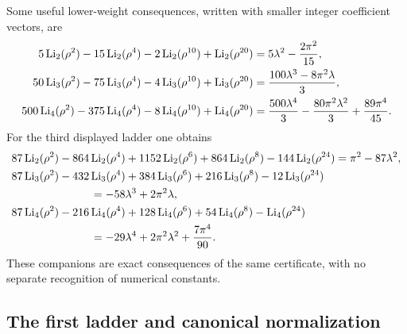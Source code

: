Some useful lower-weight consequences, written with smaller integer
coefficient vectors, are
\begin{align}
 5\operatorname{Li}_2(\rho^2)-15\operatorname{Li}_2(\rho^4)-2\operatorname{Li}_2(\rho^{10})
    +\operatorname{Li}_2(\rho^{20})
 &=5\lambda^2-\frac{2\pi^2}{15},
 \label{gold:eq:II-two}\\
 50\operatorname{Li}_3(\rho^2)-75\operatorname{Li}_3(\rho^4)-4\operatorname{Li}_3(\rho^{10})
    +\operatorname{Li}_3(\rho^{20})
 &=\frac{100\lambda^3-8\pi^2\lambda}{3},
 \label{gold:eq:II-three}\\
 500\operatorname{Li}_4(\rho^2)-375\operatorname{Li}_4(\rho^4)-8\operatorname{Li}_4(\rho^{10})
    +\operatorname{Li}_4(\rho^{20})
 &=\frac{500\lambda^4}{3}-\frac{80\pi^2\lambda^2}{3}
    +\frac{89\pi^4}{45}.
 \label{gold:eq:II-four}
\end{align}
For the third displayed ladder one obtains
\begin{align}
 &87\Li_2(\rho^2)-864\Li_2(\rho^4)+1152\Li_2(\rho^6)
       +864\Li_2(\rho^8)-144\Li_2(\rho^{24})
    =\pi^2-87\lambda^2,
 \label{gold:eq:III-two}\\
 &87\Li_3(\rho^2)-432\Li_3(\rho^4)+384\Li_3(\rho^6)
       +216\Li_3(\rho^8)-12\Li_3(\rho^{24})\notag\\
 &\hspace{25mm}=-58\lambda^3+2\pi^2\lambda,
 \label{gold:eq:III-three}\\
 &87\Li_4(\rho^2)-216\Li_4(\rho^4)+128\Li_4(\rho^6)
       +54\Li_4(\rho^8)-\Li_4(\rho^{24})\notag\\
 &\hspace{25mm}=-29\lambda^4+2\pi^2\lambda^2+\frac{7\pi^4}{90}.
 \label{gold:eq:III-four}
\end{align}
These companions are exact consequences of the same certificate, with
no separate recognition of numerical constants.

\subsection{The first ladder and canonical normalization}


